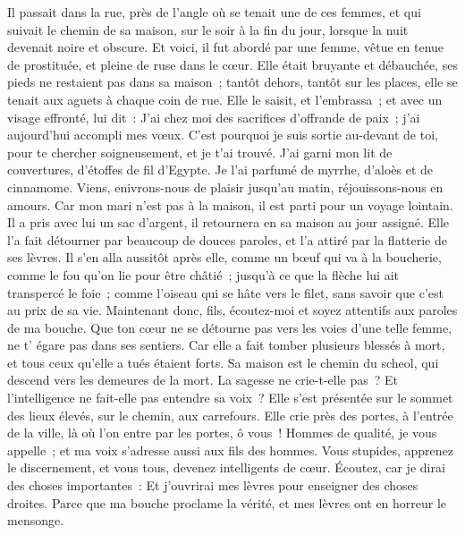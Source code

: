 \begin{multicols}{2}
Il passait dans la rue, près de l'angle où se tenait une de ces femmes, et qui suivait le chemin de sa maison,
sur le soir à la fin du jour, lorsque la nuit devenait noire et obscure.
Et voici, il fut abordé par une femme, vêtue en tenue de prostituée, et pleine de ruse dans le cœur.
Elle était bruyante et débauchée, ses pieds ne restaient pas dans sa maison~;
tantôt dehors, tantôt sur les places, elle se tenait aux aguets à chaque coin de rue.
Elle le saisit, et l'embrassa~; et avec un visage effronté, lui dit~:
J'ai chez moi des sacrifices d'offrande de paix~; j'ai aujourd'hui accompli mes vœux.
C'est pourquoi je suis sortie au-devant de toi, pour te chercher soigneusement, et je t'ai trouvé.
J'ai garni mon lit de couvertures, d'étoffes de fil d'Egypte.
Je l'ai parfumé de myrrhe, d'aloès et de cinnamome.
Viens, enivrons-nous de plaisir jusqu'au matin, réjouissons-nous en amours.
Car mon mari n'est pas à la maison, il est parti pour un voyage lointain.
Il a pris avec lui un sac d'argent, il retournera en sa maison au jour assigné.
Elle l'a fait détourner par beaucoup de douces paroles, et l'a attiré par la flatterie de ses lèvres.
Il s'en alla aussitôt après elle, comme un bœuf qui va à la boucherie, comme le fou qu'on lie pour être châtié~;
jusqu'à ce que la flèche lui ait transpercé le foie~; comme l'oiseau qui se hâte vers le filet, sans savoir que c'est au prix de sa vie.
Maintenant donc, fils, écoutez-moi et soyez attentifs aux paroles de ma bouche.
Que ton cœur ne se détourne pas vers les voies d'une telle femme, ne t' égare pas dans ses sentiers.
Car elle a fait tomber plusieurs blessés à mort, et tous ceux qu'elle a tués étaient forts.
Sa maison est le chemin du scheol, qui descend vers les demeures de la mort.
\VerseOne{}La sagesse ne crie-t-elle pas~? Et l'intelligence ne fait-elle pas entendre sa voix~?
Elle s'est présentée sur le sommet des lieux élevés, sur le chemin, aux carrefours.
Elle crie près des portes, à l'entrée de la ville, là où l'on entre par les portes,
ô vous~! Hommes de qualité, je vous appelle~; et ma voix s'adresse aussi aux fils des hommes.
Vous stupides, apprenez le discernement, et vous tous, devenez intelligents de cœur.
Écoutez, car je dirai des choses importantes~: Et j'ouvrirai mes lèvres pour enseigner des choses droites.
Parce que ma bouche proclame la vérité, et mes lèvres ont en horreur le mensonge.

\end{multicols}
